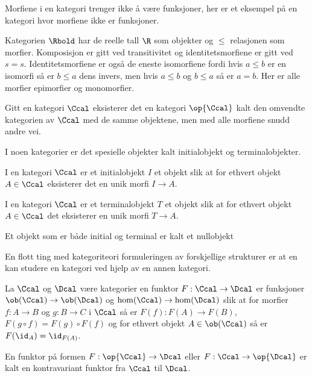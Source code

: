 Morfiene i en kategori trenger ikke å være funksjoner, her er et eksempel på en kategori hvor morfiene ikke er funksjoner.
\begin{example}\label{Ex:RPoset}
    Kategorien $\Rbold$ har de reelle tall $\R$ som objekter og $\leq$ relasjonen som morfier. Komposisjon er gitt ved transitivitet og identitetsmorfiene er gitt ved $s=s$. Identitetsmorfiene er også de eneste isomorfiene fordi hvis $a\leq b$ er en isomorfi så er $b\leq a$ dens invers, men hvis $a\leq b$ og $b\leq a$ så er $a=b$. Her er alle morfier epimorfier og monomorfier.
\end{example}

\begin{remark}\label{rem:OpKat}
  Gitt en kategori $\Ccal$ eksisterer det en kategori $\op{\Ccal}$
  kalt den omvendte kategorien av $\Ccal$ med de samme objektene,
  men med alle morfiene snudd andre vei.
\end{remark}

I noen kategorier er det spesielle objekter kalt initialobjekt og
terminalobjekter.

\begin{definition}\label{def:InitOb}
  I en kategori $\Ccal$ er et initialobjekt $I$ et objekt
  slik at for ethvert objekt $A\in\Ccal$ eksisterer det en unik
  morfi $I\to A$.
\end{definition}

\begin{definition}\label{def:TermOb}
  I en kategori $\Ccal$ er et terminalobjekt $T$ et
  objekt slik at for ethvert objekt $A\in\Ccal$ det eksisterer en
  unik morfi $T\to A$.
\end{definition}

Et objekt som er både initial og terminal er kalt et nullobjekt 

En flott ting med kategoriteori formuleringen av forskjellige
strukturer er at en kan studere en kategori ved hjelp av en annen
kategori.

\begin{definition}\label{Def:Funktor}
    La $\Ccal$ og $\Dcal$ være kategorier en funktor $F:\Ccal\to\Dcal$ er funksjoner $\ob(\Ccal)\to\ob(\Dcal)$ og $\hom(\Ccal)\to \hom(\Dcal)$ slik at for morfier $f: A\to B$ og $g: B\to C$ i $\Ccal$ så er $F(f): F(A)\to F(B)$, $F(g\circ f) = F(g)\circ F(f)$ og for ethvert objekt $A\in\ob(\Ccal)$ så er $F(\id_A)=\id_{F(A)}$.
\end{definition}

\begin{definition}\label{def:KontraFunktor}
  En funktor på formen $F:\op{\Ccal}\to\Dcal$ eller
  $F:\Ccal\to\op{\Dcal}$ er kalt en kontravariant funktor fra
  $\Ccal$ til $\Dcal$.
\end{definition}

